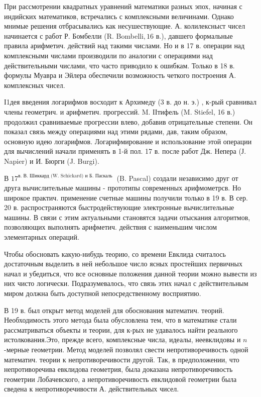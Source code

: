 \documentclass[10pt]{article}
\begin{document}
При рассмотрении квадратных уравнений математики разных эпох, начиная с индийских математиков, встречались с комплексными величинами. Однако мнимые решения отбрасывались как несушествующие. А. колилексныст чисел начинается с работ Р. Бомбелли (R. Bombel$\mathrm{li}, 16$ в.), давшего формальные правила арифметич. действий над такими числами. Но и в 17 в. операции над комплексными числами производили по аналогии с операциями над действительными числами, что часто приводило к ошибкам. Только в 18 в. формулы Муавра и Эйлера обеспечили возможность четкого построения А. комплексных чисел.



І1дея введения логарифмов восходит к Архимеду (3 в. до н. э.) , к-рый сравнивал члены геометрич. и арифметич. прогрессий. M. ІІтифель (M. Stiefel, 16 в.) продолжил сравниваемые прогрессии влево, добавив отрицательные степени. Он показал связь между операциями над этими рядами, дав, таким образом, основную идею логарифмов. Логарифмирование и использование этой операции для вычислений начали применять в 1-й пол. 17 в. после работ Дж. Непера (Ј. Napier) и И. Бюрги (J. Burgi).



В $17^{\text {в. В. Шиккард (W. Schickard) и Б. Паскаль }}$ (B. Pascal) создали независимо друг от друга вычислительные машины - прототипы современных арифмометрсв. Но широкое практич. применение счетные машины получили только в 19 в. В сер. 20 в. распространяются быстродействующие электронные вычислительные машины. В связи с этим актуальными становятся задачи отыскания алгоритмов, позволяющих выполнять арифметич. действия с наименьшим числом элементарных операций.



Чтобы обосновать какую-нибудь теорию, со времени Евклида считалось достаточным выделить в ней небольшое число ясных простейших первичных начал и убедиться, что все основные положения данной теории можно вывести из них чисто логически. Подразумевалось, что связь этих начал с действительным миром должна быть доступной непосредственному восприятию.



В 19 в. был открыт метод моделей для обоснования математич. теорий. Необходимость этого метода была обусловлена тем, что в математике стали рассматриваться объекты и теории, для к-рых не удавалось найти реального истолкования.Это, прежде всего, комплексные числа, идеалы, неевклидовы и $n$-мерные геометрии. Метод моделей позволял свести непротиворечивость одной математич. теории к непротиворечивости другой. Так, в предположении, что непротиворечива евклидова геометрия, была доказана непротиворечивость геометрии Лобачевского, а непротиворечивость евклидовой геометрии была сведена к непротиворечивости А. действительных чисел.
\end{document}
